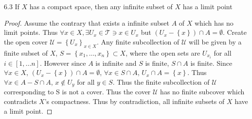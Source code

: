 \documentclass{article}
\newcommand*{\T}{\mathcal{T}}
\begin{document}
\begin{claim}{6.3}\label{Claim 6.3.}
    If $X$ has a compact space, then any infinite subset of $X$ has a limit point   
\end{claim}
\begin{proof}
    Assume the contrary that exists a infinite subset $A$ of $X$ which has no limit points. Thus $\forall x \in X, \exists U_x \in \T \ni x \in U_x $ but $\left(U_x - \left\{ x \right\}\right) \cap A = \emptyset$. Create the open cover $\mathcal{U} = \left\{ U_x \right\}_{x \in X}$. Any finite subcollection of $\mathcal{U}$ will be given by a finite subset of $X$, $S = \left\{ x_1, \dots, x_n \right\} \subset X$, where the open sets are $U_{x_i}$ for all $i \in \left[1, \dots n\right]$. However since $A$ is infinite and $S$ is finite, $S \cap A$ is finite. Since $\forall x \in X$, $\left(U_x - \left\{ x \right\}\right) \cap A = \emptyset$, $\forall x \in S \cap A$, $U_x \cap A = \left\{ x \right\}$. Thus $\forall x \in A - 
    S \cap A$, $x \not \in U_y$ for all $y \in S$. Thus the finite subcollection of $\mathcal{U}$ corresponding to S is not a cover. Thus the cover $\mathcal{U}$ has no finite subcover which contradicts $X$'s compactness. Thus by contradiction, all infinite subsets of $X$ have a limit point.                        
\end{proof}

\bigskip
\end{document}
